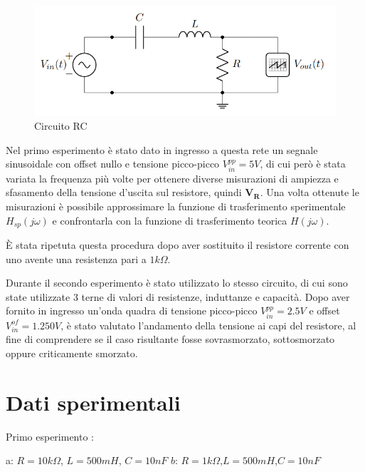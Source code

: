     \begin{figure}[!h]
        \begin{center}
            \includegraphics[width = 6 cm]{circuito.png}
            \caption{Circuito RC}
        \end{center}
    \end{figure}

    Nel primo esperimento è stato dato in ingresso a questa rete un segnale sinusoidale con offset nullo e 
    tensione picco-picco $V^{pp}_{in} = 5V$, di cui però è stata variata la frequenza più volte per ottenere diverse misurazioni
    di ampiezza e sfasamento della tensione d'uscita sul resistore, quindi $\mathbf{V_R}$.
    Una volta ottenute le misurazioni è possibile approssimare la funzione di trasferimento sperimentale $H_{sp}(j\omega)$
    e confrontarla con la funzione di trasferimento teorica $H(j\omega)$.\par
    È stata ripetuta questa procedura dopo aver sostituito il resistore corrente con uno avente una resistenza
    pari a $1k\Omega$. \par
    Durante il secondo esperimento è stato utilizzato lo stesso circuito, di cui sono state utilizzate 3 terne di valori di
    resistenze, induttanze e capacità. Dopo aver fornito in ingresso un'onda quadra di tensione picco-picco $V^{pp}_{in} = 2.5 V$
    e offset $V^{of}_{in} = 1.250 V$, è stato valutato l'andamento della tensione ai capi del resistore, al fine 
    di comprendere se il caso risultante fosse sovrasmorzato, sottosmorzato oppure criticamente smorzato. \par

    
    \section{Dati sperimentali}
    Primo esperimento : \par
    a: $R=10k\Omega$, $L=500mH$, $C=10nF$ \hspace{2.4cm} $b$: $R = 1k\Omega$,$L = 500mH $,$C = 10nF$
    
